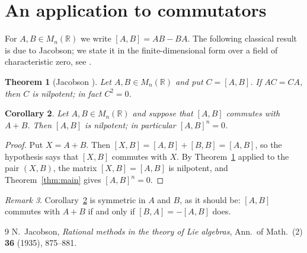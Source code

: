 \documentclass[11pt]{amsart}
\newtheorem{theorem}{Theorem}[section]
\newtheorem{corollary}[theorem]{Corollary}
\theoremstyle{definition}
\theoremstyle{remark}
\newtheorem{remark}[theorem]{Remark}
\newcommand{\R}{\mathbb{R}}
\newcommand{\M}{M_n(\R)}
\begin{document}
\section{An application to commutators}\label{sec:comm}

For $A,B\in\M$ we write $[A,B]=AB-BA$. The following classical result is due
to Jacobson; we state it in the finite-dimensional form over a field of
characteristic zero, see \cite{Jac}.

\begin{theorem}[Jacobson \cite{Jac}]\label{thm:jacobson}
Let $A,B\in\M$ and put $C=[A,B]$. If $AC=CA$, then $C$ is nilpotent; in fact
$C^2=0$.
\end{theorem}

\begin{corollary}\label{cor:comm}
Let $A,B\in\M$ and suppose that $[A,B]$ commutes with $A+B$. Then $[A,B]$ is
nilpotent; in particular $[A,B]^n=0$.
\end{corollary}

\begin{proof}
Put $X=A+B$. Then $[X,B]=[A,B]+[B,B]=[A,B]$, so the hypothesis says that
$[X,B]$ commutes with $X$. By Theorem~\ref{thm:jacobson} applied to the pair
$(X,B)$, the matrix $[X,B]=[A,B]$ is nilpotent, and
Theorem~\ref{thm:main} gives $[A,B]^n=0$.
\end{proof}

\begin{remark}
Corollary~\ref{cor:comm} is symmetric in $A$ and $B$, as it should be:
$[A,B]$ commutes with $A+B$ if and only if $[B,A]=-[A,B]$ does.
\end{remark}

\begin{thebibliography}{9}
 N.~Jacobson, \emph{Rational methods in the theory of Lie
algebras}, Ann.\ of Math.\ (2) \textbf{36} (1935), 875--881.
\end{thebibliography}
\end{document}
